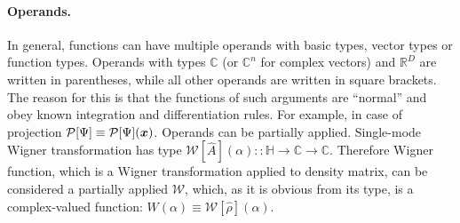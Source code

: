 \paragraph{Operands.}
In general, functions can have multiple operands with basic types, vector types or function types.
Operands with types $\mathbb{C}$ (or $\mathbb{C}^n$ for complex vectors) and $\mathbb{R}^D$ are written in parentheses,
while all other operands are written in square brackets.
The reason for this is that the functions of such arguments are ``normal'' and obey known integration and differentiation rules.
For example, in case of projection $\mathcal{P}[\Psi] \equiv \mathcal{P}[\Psi](\boldsymbol{x})$.
Operands can be partially applied.
Single-mode Wigner transformation has type $\mathcal{W}[\hat{A}](\alpha) :: \mathbb{H} \rightarrow \mathbb{C} \rightarrow \mathbb{C}$.
Therefore Wigner function, which is a Wigner transformation applied to density matrix, can be considered a partially applied $\mathcal{W}$,
which, as it is obvious from its type, is a complex-valued function: $W(\alpha) \equiv \mathcal{W}[\hat{\rho}](\alpha)$.
